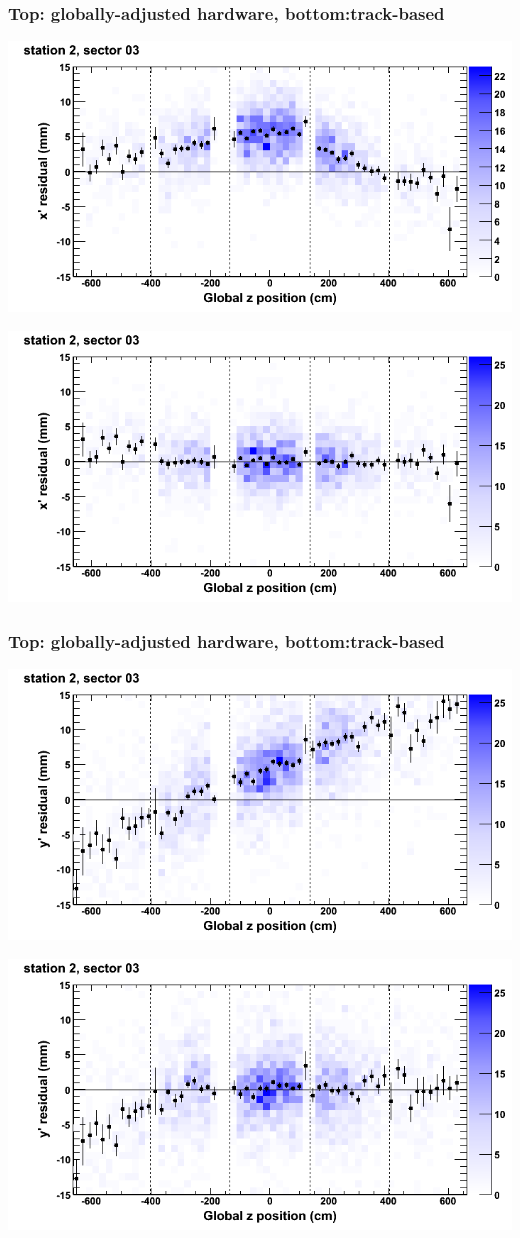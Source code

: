 \documentclass[compress]{beamer}
\begin{document}
\begin{frame}
\frametitle{Top: globally-adjusted hardware, bottom:track-based}
\includegraphics[width=0.7\linewidth]{NOV4_mapplots_HW/DTvsz_st2sec03_x.png}

\includegraphics[width=0.7\linewidth]{NOV4_mapplots/DTvsz_st2sec03_x.png}
\end{frame}

\begin{frame}
\frametitle{Top: globally-adjusted hardware, bottom:track-based}
\includegraphics[width=0.7\linewidth]{NOV4_mapplots_HW/DTvsz_st2sec03_y.png}

\includegraphics[width=0.7\linewidth]{NOV4_mapplots/DTvsz_st2sec03_y.png}
\end{frame}
\end{document}
